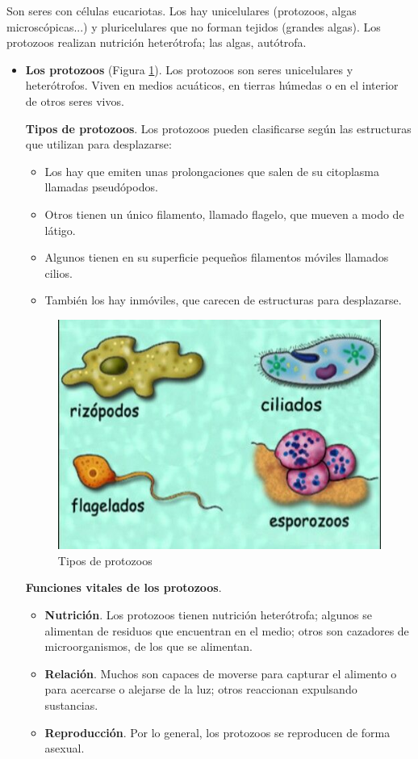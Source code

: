 Son seres con células eucariotas. Los hay unicelulares (protozoos, algas microscópicas...) y pluricelulares que no forman tejidos (grandes algas). Los protozoos realizan nutrición heterótrofa; las algas, autótrofa.

\begin{itemize}
    \item \textbf{Los protozoos} (Figura \ref{fig:tipos-protozoos}). Los protozoos son seres unicelulares y heterótrofos. Viven en medios acuáticos, en tierras húmedas o en el interior de otros seres vivos.

    \textbf{Tipos de protozoos}. Los protozoos pueden clasificarse según las estructuras que utilizan para desplazarse:
    \begin{itemize}
        \item Los hay que emiten unas prolongaciones que salen de su citoplasma llamadas pseudópodos.
        \item Otros tienen un único filamento, llamado flagelo, que mueven a modo de látigo.
        \item Algunos tienen en su superficie pequeños filamentos móviles llamados cilios.
        \item También los hay inmóviles, que carecen de estructuras para desplazarse.
    \end{itemize}

    \begin{figure}[!ht]
        \centering
        \includegraphics[width=0.65\linewidth]{Tema1/10_Tipos_protozoos.jpg}
        \caption{Tipos de protozoos}
        \label{fig:tipos-protozoos}
    \end{figure}

    \textbf{Funciones vitales de los protozoos}.
    \begin{itemize}
        \item \textbf{Nutrición}. Los protozoos tienen nutrición heterótrofa; algunos se alimentan de residuos que encuentran en el medio; otros son cazadores de microorganismos, de los que se alimentan.
        \item \textbf{Relación}. Muchos son capaces de moverse para capturar el alimento o para acercarse o alejarse de la luz; otros reaccionan expulsando sustancias.
        \item \textbf{Reproducción}. Por lo general, los protozoos se reproducen de forma asexual.
    \end{itemize}


\end{itemize}
